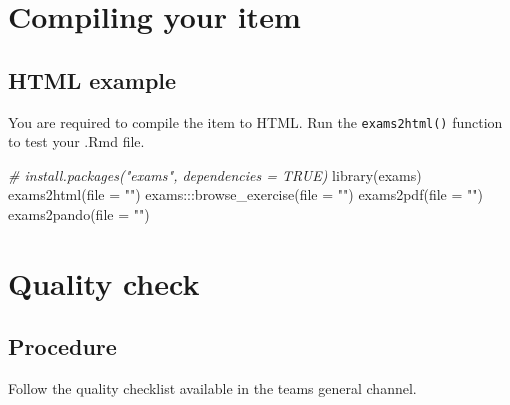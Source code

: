 \documentclass[
]{article}
\newenvironment{Shaded}{\begin{snugshade}}{\end{snugshade}}
\newcommand{\AttributeTok}[1]{\textcolor[rgb]{0.77,0.63,0.00}{#1}}
\newcommand{\CommentTok}[1]{\textcolor[rgb]{0.56,0.35,0.01}{\textit{#1}}}
\newcommand{\FunctionTok}[1]{\textcolor[rgb]{0.00,0.00,0.00}{#1}}
\newcommand{\NormalTok}[1]{#1}
\newcommand{\SpecialCharTok}[1]{\textcolor[rgb]{0.00,0.00,0.00}{#1}}
\newcommand{\StringTok}[1]{\textcolor[rgb]{0.31,0.60,0.02}{#1}}
\begin{document}
\hypertarget{compiling-your-item}{%
\section{Compiling your item}\label{compiling-your-item}}

\hypertarget{html-example}{%
\subsection{HTML example}\label{html-example}}

You are required to compile the item to HTML. Run the
\texttt{exams2html()} function to test your .Rmd file.

\begin{Shaded}
\begin{Highlighting}[]
\CommentTok{\# install.packages("exams", dependencies = TRUE)}
\FunctionTok{library}\NormalTok{(exams)}
\FunctionTok{exams2html}\NormalTok{(}\AttributeTok{file =} \StringTok{""}\NormalTok{)}
\NormalTok{exams}\SpecialCharTok{:::}\FunctionTok{browse\_exercise}\NormalTok{(}\AttributeTok{file =} \StringTok{""}\NormalTok{)}
\FunctionTok{exams2pdf}\NormalTok{(}\AttributeTok{file =} \StringTok{""}\NormalTok{)}
\FunctionTok{exams2pando}\NormalTok{(}\AttributeTok{file =} \StringTok{""}\NormalTok{)}
\end{Highlighting}
\end{Shaded}

\hypertarget{quality-check}{%
\section{Quality check}\label{quality-check}}

\hypertarget{procedure-1}{%
\subsection{Procedure}\label{procedure-1}}

Follow the quality checklist available in the teams general channel.
\end{document}
